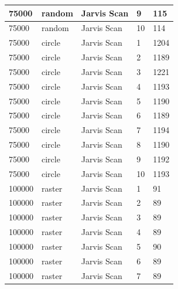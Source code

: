 \documentclass[12pt]{article}
\begin{document}
\begin{longtable}{|l|l|l|l|l|}
75000        & random            & Jarvis Scan & 9          & 115                           \\ \hline
75000        & random            & Jarvis Scan & 10         & 114                           \\ \hline
75000        & circle            & Jarvis Scan & 1          & 1204                          \\ \hline
75000        & circle            & Jarvis Scan & 2          & 1189                          \\ \hline
75000        & circle            & Jarvis Scan & 3          & 1221                          \\ \hline
75000        & circle            & Jarvis Scan & 4          & 1193                          \\ \hline
75000        & circle            & Jarvis Scan & 5          & 1190                          \\ \hline
75000        & circle            & Jarvis Scan & 6          & 1189                          \\ \hline
75000        & circle            & Jarvis Scan & 7          & 1194                          \\ \hline
75000        & circle            & Jarvis Scan & 8          & 1190                          \\ \hline
75000        & circle            & Jarvis Scan & 9          & 1192                          \\ \hline
75000        & circle            & Jarvis Scan & 10         & 1193                          \\ \hline
100000       & raster            & Jarvis Scan & 1          & 91                            \\ \hline
100000       & raster            & Jarvis Scan & 2          & 89                            \\ \hline
100000       & raster            & Jarvis Scan & 3          & 89                            \\ \hline
100000       & raster            & Jarvis Scan & 4          & 89                            \\ \hline
100000       & raster            & Jarvis Scan & 5          & 90                            \\ \hline
100000       & raster            & Jarvis Scan & 6          & 89                            \\ \hline
100000       & raster            & Jarvis Scan & 7          & 89                            \\ \hline

\end{longtable}
\end{document}
